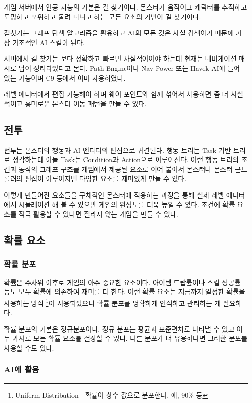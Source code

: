\documentclass[chapter,kosection, 10.5pt, romanfixed, a4paper]{oblivoir}
\begin{document}
게임 서버에서 인공 지능의 기본은 길 찾기이다. 몬스터가 움직이고 캐릭터를 추적하고 
도망하고 포위하고 몰려 다니고 하는 모든 요소의 기반이 길 찾기이다. 

길찾기는 그래프 탐색 알고리즘을 활용하고 AI의 모든 것은 사실 검색이기 때문에
가장 기초적인 AI 스킬이 된다. 

서버에서 길 찾기는 보다 정확하고 빠르면 사실적이어야 하는데 현재는 네비게이션 매시로 
답이 정리되었다고 본다. Path Engine이나 Nav Power 또는 Havok AI에 들어 있는 기능이며 
C9 등에서 이미 사용하였다. 

레벨 에디터에서 편집 가능해야 하며 웨이 포인트와 함께 섞어서 사용하면 좀 더 사실적이고
흥미로운 몬스터 이동 패턴을 만들 수 있다. 

\subsection{전투}

전투는 몬스터의 행동과 AI 엔티티의 편집으로 귀결된다. 행동 트리는 Task 기반 트리로 생각하는데
이들 Task는 Condition과 Action으로 이루어진다. 이런 행동 트리의 조건과 동작의 그래프 구조를
게임에서 제공된 요소로 이어 붙여서 몬스터나 몬스터 콘트롤러의 편집이 이루어지면 다양한 요소를
재미있게 만들 수 있다. 

이렇게 만들어진 요소들을 구체적인 몬스터에 적용하는 과정을 통해 실제 레벨 에디터에서 
시뮬레이션 해 볼 수 있으면 게임의 완성도를 더욱 높일 수 있다. 조건에 확률 요소를 적극 
활용할 수 있다면 질리지 않는 게임을 만들 수 있다. 

\subsection{확률 요소}

\subsubsection{확률 분포}
확률은 주사위 이후로 게임의 아주 중요한 요소이다. 아이템 드랍률이나 스킬 성공률 등도 모두 
확률에 의존하여 재미를 더 한다. 이런 확률 요소는 지금까지 일정한 확률을 사용하는 방식
\footnote{Uniform Distribution - 확률이 상수 값으로 분포한다. 예, 90\% 등}이 사용되었으나 
확률 분포를 명확하게 인식하고 관리하는 게 필요하다. 

확률 분포의 기본은 정규분포이다. 정규 분포는 평균과 표준편차로 나타낼 수 있고 이 두 가지로 
모든 확률 요소를 결정할 수 있다. 다른 분포가 더 유용하다면 그러한 분포를 사용할 수도 있다. 

\subsubsection{AI에 활용}
\end{document}

